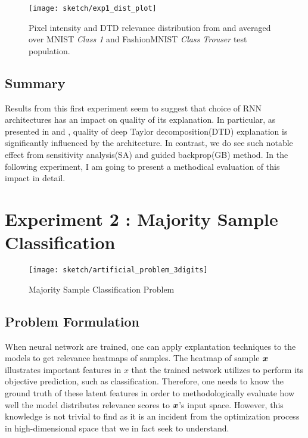  \begin{figure}[h]
\centering
\texttt{[image: sketch/exp1\_dist\_plot]}
\caption{Pixel intensity and DTD relevance distribution from  and  averaged over MNIST \textit{Class 1} and FashionMNIST \textit{Class Trouser} test population.} 
\label{fig:exp1_dist_plot}
\end{figure}

\subsection{Summary}
Results from this first experiment seem to suggest that choice of RNN architectures has an impact on quality of its explanation.  In particular,  as presented in \addfigure{\ref{fig:class_1_comparison}} and \addfigure{\ref{fig:exp1_dist_plot}}, quality of deep Taylor decomposition(DTD) explanation is significantly influenced by the architecture. In contrast, we do see such notable effect from sensitivity analysis(SA) and guided backprop(GB) method.  In the following experiment, I am going to present a methodical evaluation of this impact in detail.



\section{Experiment 2 : Majority Sample Classification} \label{sec:exp2}
   
 \begin{figure}[h]
\centering
\texttt{[image: sketch/artificial\_problem\_3digits]}
\caption{Majority Sample Classification Problem} 
\label{fig:artificial_problem_3digits}
\end{figure}

\subsection{Problem Formulation} \label{sec:exp2_prob_formulate}
When neural network are trained, one can apply explantation techniques to the models to get relevance heatmaps of samples.  The heatmap of sample $\boldsymbol{x}$ illustrates important features in $x$ that the trained network utilizes to perform its objective prediction,  such as classification.  Therefore, one needs to know the ground truth of these latent features in order to methodologically evaluate how well the model distributes  relevance scores to $\boldsymbol{x}$'s input space. However,  this knowledge is not trivial to find as it is an incident from the optimization process in high-dimensional space that we in fact seek to understand.

